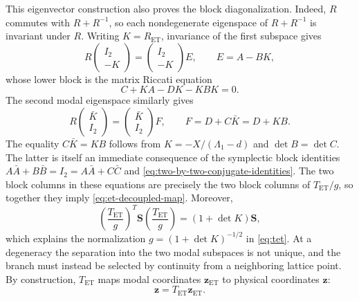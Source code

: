 \documentclass[11pt,a4paper]{article}
\newcommand{\mat}[1]{\bm{#1}}
\begin{document}
This eigenvector construction also proves the block diagonalization.  Indeed,
$R$ commutes with $R+R^{-1}$, so each nondegenerate eigenspace of
$R+R^{-1}$ is invariant under $R$.  Writing $K=R_{\mathrm{ET}}$, invariance
of the first subspace gives
\begin{equation}
 R\begin{pmatrix}I_2\\-K\end{pmatrix}
 =\begin{pmatrix}I_2\\-K\end{pmatrix}E,
 \qquad
 E=A-BK,
 \label{eq:first-et-invariant-subspace}
\end{equation}
whose lower block is the matrix Riccati equation
\begin{equation}
 C+KA-DK-KBK=0.
 \label{eq:et-riccati}
\end{equation}
The second modal eigenspace similarly gives
\begin{equation}
 R\begin{pmatrix}\bar K\\I_2\end{pmatrix}
 =\begin{pmatrix}\bar K\\I_2\end{pmatrix}F,
 \qquad
 F=D+C\bar K=D+KB.
 \label{eq:second-et-invariant-subspace}
\end{equation}
The equality $C\bar K=KB$ follows from
$K=-X/(\Lambda_1-d)$ and $\det B=\det C$.  The latter is itself an immediate
consequence of the symplectic block identities
$A\bar A+B\bar B=I_2=A\bar A+C\bar C$ and
\cref{eq:two-by-two-conjugate-identities}.
The two block columns in these equations are precisely the two block columns
of $T_{\mathrm{ET}}/g$, so together they imply
\cref{eq:et-decoupled-map}.  Moreover,
\begin{equation}
 \left(\frac{T_{\mathrm{ET}}}{g}\right)^T
 \mat S
 \left(\frac{T_{\mathrm{ET}}}{g}\right)
 =\left(1+\det K\right)\mat S,
\end{equation}
which explains the normalization $g=(1+\det K)^{-1/2}$ in
\cref{eq:tet}.  At a degeneracy the separation into the two modal subspaces
is not unique, and the branch must instead be selected by continuity from a
neighboring lattice point.
By construction, $T_{\mathrm{ET}}$ maps modal coordinates
$\mat z_{\mathrm{ET}}$ to physical coordinates $\mat z$:
\begin{equation}
 \mat z=T_{\mathrm{ET}}\mat z_{\mathrm{ET}}.
\end{equation}
\end{document}
